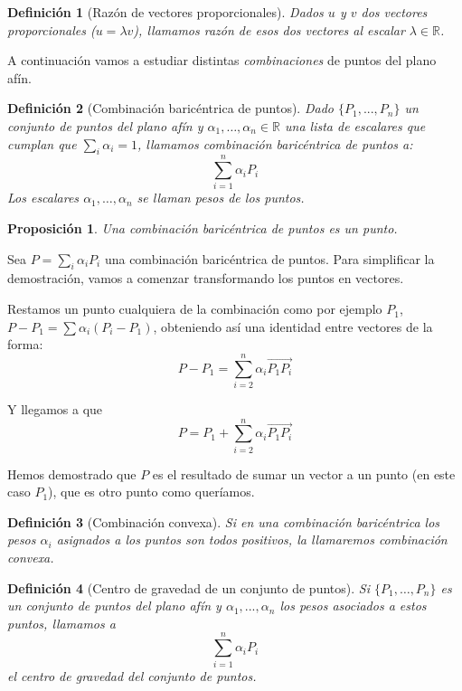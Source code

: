 \documentclass[11pt, a4paper]{article}
\makeatletter
\newif\IfInSansMode
\let\oldsf\sffamily
\renewcommand*{\sffamily}{\oldsf\mathversion{sans}\InSansModetrue}
\let\oldnorm\normalfont
\renewcommand*{\normalfont}{\oldnorm\InSansModefalse\mathversion{normal}}
\renewenvironment{proof}[1][\proofname] {\vspace{-15pt}\par\pushQED{\qed}\normalfont\topsep6\p@\@plus6\p@\relax\trivlist\item[\hskip\labelsep\it#1\@addpunct{.}]\ignorespaces}{\popQED\endtrivlist\@endpefalse}
\newcommand{\R}{\mathbb{R}}
\renewenvironment{proof}[1][\proofname] {\par\pushQED{\qed}\normalfont\topsep6\p@\@plus6\p@\relax\trivlist\item[\hskip\labelsep\itshape\sffamily#1\@addpunct{.}]\ignorespaces}{\popQED\endtrivlist\@endpefalse}
\theoremstyle{theorem-style}
\newtheorem{nprop}{Proposición}[section]
\theoremstyle{definition-style}
\newtheorem{ndef}{Definición}[section]
\theoremstyle{remark-style}
\theoremstyle{example-style}
\makeatother
\begin{document}
\begin{ndef}[Razón de vectores proporcionales]
  Dados $u$ y $v$ dos vectores proporcionales ($u = \lambda v$), llamamos \textit{razón} de esos dos vectores al escalar $\lambda \in \R$.
\end{ndef}

A continuación vamos a estudiar distintas \textit{combinaciones} de puntos del plano afín.

\begin{ndef}[Combinación baricéntrica de puntos]
  Dado $\{P_1,...,P_n\}$ un conjunto de puntos del plano afín y $\alpha_1,\dots,\alpha_n \in \R$ una lista de escalares que cumplan que $\sum_i \alpha_i = 1$, llamamos \textit{combinación baricéntrica de puntos} a:
  \[
    \sum_{i=1}^n \alpha_i P_i
  \]
  Los escalares $\alpha_1,\dots,\alpha_n$ se llaman \textit{pesos} de los puntos.
\end{ndef}

\begin{nprop} Una combinación baricéntrica de puntos es un punto. 
\end{nprop}

\begin{proof}

  Sea $P = \sum_i \alpha_i P_i$ una combinación baricéntrica de puntos. Para simplificar la demostración, vamos a comenzar transformando los puntos en vectores.

  Restamos un punto cualquiera de la combinación como por ejemplo $P_1$, $P-P_1 = \sum \alpha_i(P_i-P_1)$, obteniendo así una identidad entre vectores de la forma:
  \[
    P-P_1 = \sum_{i=2}^n \alpha_i \overrightarrow{P_1P_i}
  \]

  Y llegamos a que
  \[
    P = P_1 + \sum_{i=2}^n \alpha_i \overrightarrow{P_1P_i}
  \]
  
  Hemos demostrado que $P$ es el resultado de sumar un vector a un punto (en este caso $P_1$), que es otro punto como queríamos.
\end{proof}

\begin{ndef}[Combinación convexa]
  Si en una combinación baricéntrica los pesos $\alpha_i$ asignados a los puntos son todos positivos, la llamaremos \textit{combinación convexa}. \end{ndef}

\begin{ndef}[Centro de gravedad de un conjunto de puntos]
  Si $\{P_1,\dots,P_n\}$ es un conjunto de puntos del plano afín y $\alpha_1,...,\alpha_n$ los \textit{pesos} asociados a estos puntos, llamamos a
  \[
    \sum_{i=1}^n \alpha_iP_i
  \]
  el \textit{centro de gravedad del conjunto de puntos}.
\end{ndef}
\end{document}
